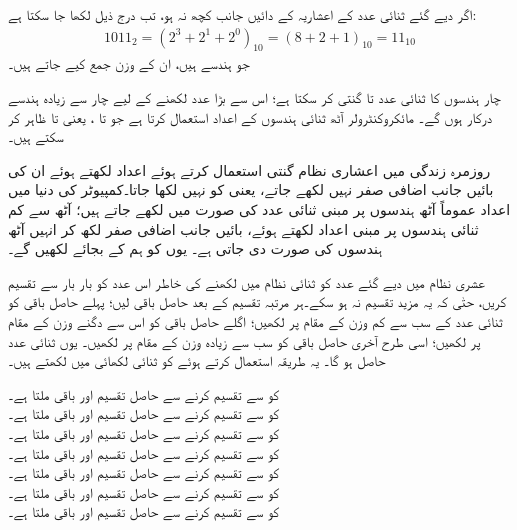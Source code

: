 اگر دیے گئے ثنائی عدد کے اعشاریہ کے دائیں جانب کچھ نہ ہو، تب درج ذیل لکھا جا سکتا ہے:
\begin{align}
1011_2=(2^3+2^1+2^0)_{10}=(8+2+1)_{10}=11_{10}
\end{align}
 جو ہندسے  ہیں، ان کے وزن جمع کیے جاتے ہیں۔

چار ہندسوں کا ثنائی عدد  تا  گنتی کر سکتا ہے؛ اس سے بڑا عدد لکھنے کے لیے چار سے زیادہ ہندسے درکار ہوں گے۔ مائکروکنٹرولر آٹھ ثنائی ہندسوں کے اعداد استعمال کرتا ہے جو  تا ، یعنی  تا  ظاہر کر سکتے ہیں۔

روزمرہ زندگی میں اعشاری نظام گنتی استعمال کرتے ہوئے اعداد لکھتے ہوئے ان کی بائیں جانب اضافی صفر نہیں لکھے جاتے، یعنی  کو  نہیں لکھا جاتا۔کمپیوٹر کی دنیا میں اعداد عموماً آٹھ ہندسوں پر مبنی ثنائی عدد کی صورت میں لکھے جاتے ہیں؛ آٹھ سے کم ثنائی ہندسوں پر مبنی اعداد لکھتے ہوئے، بائیں جانب اضافی صفر لکھ کر انہیں آٹھ ہندسوں کی صورت دی جاتی ہے۔ یوں  کو ہم  کے بجائے  لکھیں گے۔


عشری  نظام میں دیے گئے عدد کو ثنائی نظام میں لکھنے کی خاطر اس عدد کو بار بار  سے تقسیم کریں، حتٰی کہ یہ مزید تقسیم نہ ہو سکے۔ہر مرتبہ تقسیم کے بعد حاصل باقی لیں؛ پہلے حاصل باقی کو ثنائی عدد کے سب سے کم وزن کے مقام پر لکھیں؛ اگلے حاصل باقی کو اس سے دگنے وزن کے مقام پر لکھیں؛ اسی طرح آخری حاصل باقی کو سب سے زیادہ وزن کے مقام پر لکھیں۔ یوں ثنائی عدد حاصل ہو گا۔	یہ طریقہ استعمال کرتے ہوئے  کو ثنائی لکھائی میں لکھتے ہیں۔

 کو  سے تقسیم کرنے سے حاصل تقسیم  اور باقی  ملتا ہے۔\\
 کو  سے تقسیم کرنے سے حاصل تقسیم  اور باقی  ملتا ہے۔\\
 کو  سے تقسیم کرنے سے حاصل تقسیم  اور باقی  ملتا ہے۔\\
 کو  سے تقسیم کرنے سے حاصل تقسیم  اور باقی  ملتا ہے۔\\
 کو  سے تقسیم کرنے سے حاصل تقسیم  اور باقی  ملتا ہے۔\\
 کو  سے تقسیم کرنے سے حاصل تقسیم  اور باقی  ملتا ہے۔\\
 کو  سے تقسیم کرنے سے حاصل تقسیم  اور باقی  ملتا ہے۔



